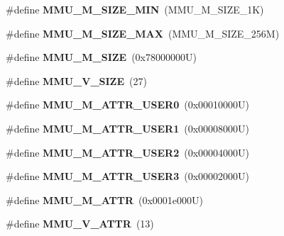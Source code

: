 \begin{DoxyCompactItemize}
\mbox{\label{group__Virtex5MMU_ga1df5ab0999222827c93ffe715860bdc1}} 
\#define {\bfseries M\+M\+U\+\_\+\+M\+\_\+\+S\+I\+Z\+E\+\_\+\+M\+IN}~(M\+M\+U\+\_\+\+M\+\_\+\+S\+I\+Z\+E\+\_\+1K)
\item 
\mbox{\label{group__Virtex5MMU_gab053ea65db7bdc7674f16ffe0bb109d4}} 
\#define {\bfseries M\+M\+U\+\_\+\+M\+\_\+\+S\+I\+Z\+E\+\_\+\+M\+AX}~(M\+M\+U\+\_\+\+M\+\_\+\+S\+I\+Z\+E\+\_\+256M)
\item 
\mbox{\label{group__Virtex5MMU_ga823b6a9c9742a4b3a932721fa0cbe0ea}} 
\#define {\bfseries M\+M\+U\+\_\+\+M\+\_\+\+S\+I\+ZE}~(0x78000000\+U)
\item 
\mbox{\label{group__Virtex5MMU_ga61ded55783abfe10c2f59c6e3e9476a9}} 
\#define {\bfseries M\+M\+U\+\_\+\+V\+\_\+\+S\+I\+ZE}~(27)
\item 
\mbox{\label{group__Virtex5MMU_ga8a4595a461d5e24357044fac1290d044}} 
\#define {\bfseries M\+M\+U\+\_\+\+M\+\_\+\+A\+T\+T\+R\+\_\+\+U\+S\+E\+R0}~(0x00010000\+U)
\item 
\mbox{\label{group__Virtex5MMU_gaa25a0a189009e0d3527d9cd6869bd02c}} 
\#define {\bfseries M\+M\+U\+\_\+\+M\+\_\+\+A\+T\+T\+R\+\_\+\+U\+S\+E\+R1}~(0x00008000\+U)
\item 
\mbox{\label{group__Virtex5MMU_gad697171f73ad43d9119e4916d32e496d}} 
\#define {\bfseries M\+M\+U\+\_\+\+M\+\_\+\+A\+T\+T\+R\+\_\+\+U\+S\+E\+R2}~(0x00004000\+U)
\item 
\mbox{\label{group__Virtex5MMU_gad38a944b2d016e9387564d421257060a}} 
\#define {\bfseries M\+M\+U\+\_\+\+M\+\_\+\+A\+T\+T\+R\+\_\+\+U\+S\+E\+R3}~(0x00002000\+U)
\item 
\mbox{\label{group__Virtex5MMU_gaefa34e63844b2c93c4532346c6d332fc}} 
\#define {\bfseries M\+M\+U\+\_\+\+M\+\_\+\+A\+T\+TR}~(0x0001e000\+U)
\item 
\mbox{\label{group__Virtex5MMU_ga81a7ed47655c2789a97fbbd6314f6710}} 
\#define {\bfseries M\+M\+U\+\_\+\+V\+\_\+\+A\+T\+TR}~(13)

\end{DoxyCompactItemize}
